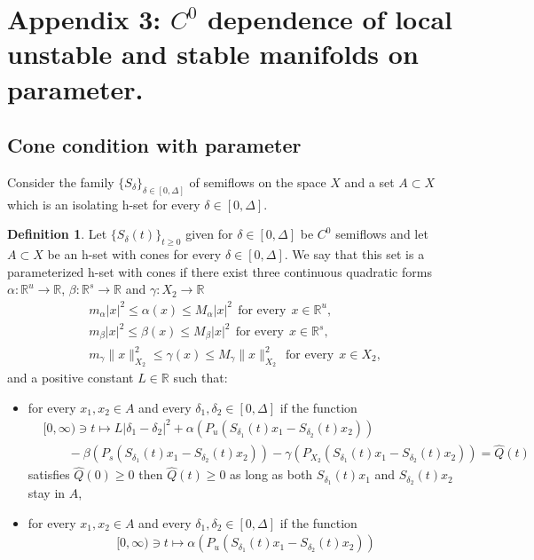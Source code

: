 \documentclass[11pt, leqno]{amsart}
\theoremstyle{definition}
\newtheorem{df}[thm]{Definition}
\def\R{\mathbb{R}}
\begin{document}
\section{Appendix 3: $C^0$ dependence of local unstable and stable manifolds on parameter.}
\subsection{Cone condition with parameter} Consider the family $\{S_\delta\}_{\delta \in [0,\Delta]}$ of semiflows on the space $X$ and a set $A\subset X$ which is an isolating h-set for every $\delta \in [0,\Delta]$.
\begin{df}\label{df:hconespar}
	Let $\{S_\delta(t)\}_{t\geq 0}$ given for  $\delta \in [0,\Delta]$ be $C^0$ semiflows and let $A \subset X$ be an h-set with cones for every $\delta \in [0,\Delta]$. We say that this set is a parameterized h-set with cones if there exist three continuous quadratic  forms $\alpha:\mathbb{R}^u \to \R$, $\beta:\mathbb{R}^{s} \to \R$ and $\gamma: X_2\to \R$
	\begin{align*}
		& m_\alpha |x|^2 \leq \alpha(x) \leq M_{\alpha}|x|^2\ \ \textrm{for every}\ \ x\in \mathbb{R}^u,\\
		& m_\beta |x|^2 \leq \beta(x) \leq M_{\beta}|x|^2\ \ \textrm{for every}\ \ x\in \mathbb{R}^{s},\\
		& m_\gamma \|x\|_{X_2}^2 \leq \gamma(x) \leq M_{\gamma}\|x\|_{X_2}^2\ \ \textrm{for every}\ \ x\in X_2,
	\end{align*}
	and a positive constant $L\in \mathbb{R}$ such that:
	\begin{itemize}
		\item[(i)] for every $x_1, x_2\in A$ and every $\delta_1,\delta_2\in [0,\Delta]$ if the function
		\begin{align*}
			&	[0,\infty) \ni t\mapsto  L|\delta_1-\delta_2|^2 + \alpha(P_u (S_{\delta_1}(t)x_1-S_{\delta_2}(t)x_2))\\
			& \qquad  - \beta(P_{s} (S_{\delta_1}(t)x_1-S_{\delta_2}(t)x_2)) - \gamma(P_{X_2} (S_{\delta_1}(t)x_1-S_{\delta_2}(t)x_2)) = \widehat{Q}(t)
		\end{align*}
		satisfies $\widehat{Q}(0) \geq 0$ then $\widehat{Q}(t)\geq 0$ as long as both $S_{\delta_1}(t)x_1$ and $S_{\delta_2}(t)x_2$ stay in $A$,
		\item[(ii)] for every $x_1, x_2\in A$ and every $\delta_1,\delta_2\in [0,\Delta]$ if the function
		\begin{align*}
			&[0,\infty) \ni t\mapsto  \alpha(P_u (S_{\delta_1}(t)x_1-S_{\delta_2}(t)x_2)) \\

\end{align*}
\end{itemize}
\end{df}
\end{document}
